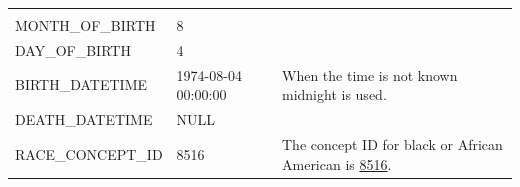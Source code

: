 \documentclass[11pt]{book}
\theoremstyle{definition}
\theoremstyle{definition}
\theoremstyle{definition}
\theoremstyle{remark}
\begin{document}
\begin{longtable}[]{@{}lll@{}}
\begin{minipage}[t]{0.49\columnwidth}
\strut
\end{minipage}\tabularnewline
\begin{minipage}[t]{0.28\columnwidth}\raggedright
MONTH\_OF\_BIRTH\strut
\end{minipage} & \begin{minipage}[t]{0.15\columnwidth}\raggedright
8\strut
\end{minipage} & \begin{minipage}[t]{0.49\columnwidth}\raggedright
\strut
\end{minipage}\tabularnewline
\begin{minipage}[t]{0.28\columnwidth}\raggedright
DAY\_OF\_BIRTH\strut
\end{minipage} & \begin{minipage}[t]{0.15\columnwidth}\raggedright
4\strut
\end{minipage} & \begin{minipage}[t]{0.49\columnwidth}\raggedright
\strut
\end{minipage}\tabularnewline
\begin{minipage}[t]{0.28\columnwidth}\raggedright
BIRTH\_DATETIME\strut
\end{minipage} & \begin{minipage}[t]{0.15\columnwidth}\raggedright
1974-08-04 00:00:00\strut
\end{minipage} & \begin{minipage}[t]{0.49\columnwidth}\raggedright
When the time is not known midnight is used.\strut
\end{minipage}\tabularnewline
\begin{minipage}[t]{0.28\columnwidth}\raggedright
DEATH\_DATETIME\strut
\end{minipage} & \begin{minipage}[t]{0.15\columnwidth}\raggedright
NULL\strut
\end{minipage} & \begin{minipage}[t]{0.49\columnwidth}\raggedright
\strut
\end{minipage}\tabularnewline
\begin{minipage}[t]{0.28\columnwidth}\raggedright
RACE\_CONCEPT\_ID\strut
\end{minipage} & \begin{minipage}[t]{0.15\columnwidth}\raggedright
8516\strut
\end{minipage} & \begin{minipage}[t]{0.49\columnwidth}\raggedright
The concept ID for black or African American is \href{http://athena.ohdsi.org/search-terms/terms/8516}{8516}.\strut

\end{minipage}
\end{longtable}
\end{document}
